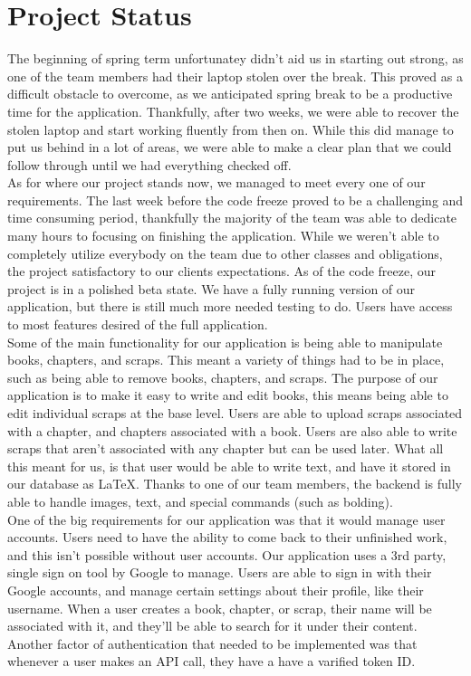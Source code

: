 \documentclass[onecolumn, draftclsnofoot,10pt, compsoc]{IEEEtran}
\begin{document}
\newpage

\section{Project Status}

\noindent The beginning of spring term unfortunatey didn't aid us in starting out strong, 
as one of the team members had their laptop stolen over the break. This proved as a 
difficult obstacle to overcome, as we anticipated spring break to be a productive time 
for the application. Thankfully, after two weeks, we were able to recover the stolen 
laptop and start working fluently from then on. While this did manage to put us behind
in a lot of areas, we were able to make a clear plan that we could follow through until 
we had everything checked off. \\

\noindent As for where our project stands now, we managed to meet every one of our requirements. 
The last week before the code freeze proved to be a challenging and time
consuming period, thankfully the majority of the team was able to dedicate many hours to focusing 
on finishing the application. While we weren't able to completely utilize everybody on the 
team due to other classes and obligations, the project satisfactory to our clients expectations.
As of the code freeze, our project is in a polished beta state. We have a fully running version 
of our application, but there is still much more needed testing to do. Users have access to most features 
desired of the full application. \\

\noindent Some of the main functionality for our application is being able to manipulate books, 
chapters, and scraps. This meant a variety of things had to be in place, such as being able to 
remove books, chapters, and scraps. The purpose of our application is to make it easy to write 
and edit books, this means being able to edit individual scraps at the base level. Users are able 
to upload scraps associated with a chapter, and chapters associated with a book. Users are also 
able to write scraps that aren't associated with any chapter but can be used later. What all this
meant for us, is that user would be able to write text, and have it stored in our database as 
LaTeX. Thanks to one of our team members, the backend is fully able to handle images, text, and 
special commands (such as bolding). \\

\noindent One of the big requirements for our application was that it would manage user accounts. 
Users need to have the ability to come back to their unfinished work, and this isn't possible without
user accounts. Our application uses a 3rd party, single sign on tool by Google to manage. Users are 
able to sign in with their Google accounts, and manage certain settings about their profile, like 
their username. When a user creates a book, chapter, or scrap, their name will be associated with it, 
and they'll be able to search for it under their content. Another factor of authentication that needed 
to be implemented was that whenever a user makes an API call, they have a have a varified token ID. \\
\end{document}
